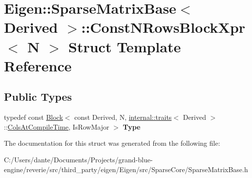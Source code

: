 \hypertarget{struct_eigen_1_1_sparse_matrix_base_1_1_const_n_rows_block_xpr}{}\section{Eigen\+::Sparse\+Matrix\+Base$<$ Derived $>$\+::Const\+N\+Rows\+Block\+Xpr$<$ N $>$ Struct Template Reference}
\label{struct_eigen_1_1_sparse_matrix_base_1_1_const_n_rows_block_xpr}
\subsection*{Public Types}
\begin{DoxyCompactItemize}
\item 
\mbox{\label{struct_eigen_1_1_sparse_matrix_base_1_1_const_n_rows_block_xpr_a2aac4e649b8b3c886614ccd40a7f2b63}} 
typedef const \mbox{\hyperlink{class_eigen_1_1_block}{Block}}$<$ const Derived, N, \mbox{\hyperlink{struct_eigen_1_1internal_1_1traits}{internal\+::traits}}$<$ Derived $>$\+::\mbox{\hyperlink{class_eigen_1_1_sparse_matrix_base_a11b30ed44f64a137b4fa1ee638ca2d36a27ba349f075d026c1f51d1ec69aa5b14}{Cols\+At\+Compile\+Time}}, Is\+Row\+Major $>$ {\bfseries Type}
\end{DoxyCompactItemize}


The documentation for this struct was generated from the following file\+:\begin{DoxyCompactItemize}
\item 
C\+:/\+Users/dante/\+Documents/\+Projects/grand-\/blue-\/engine/reverie/src/third\+\_\+party/eigen/\+Eigen/src/\+Sparse\+Core/Sparse\+Matrix\+Base.\+h\end{DoxyCompactItemize}
